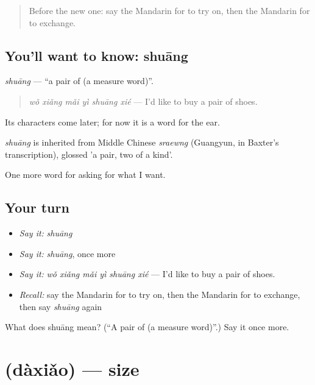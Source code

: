 \begin{quote}
Before the new one: say the Mandarin for to try on, then the Mandarin for to exchange.
\end{quote}

\subsection*{You'll want to know: shuāng}
\emph{shuāng} — \textquotedblleft{}a pair of (a measure word)\textquotedblright{}.

\begin{quote}
\emph{wǒ xiǎng mǎi yì shuāng xié} — I'd like to buy a pair of shoes.
\end{quote}

Its characters come later; for now it is a word for the ear.

\begin{cousinweb}
\emph{shuāng} is inherited from Middle Chinese \emph{sraewng} (Guangyun, in Baxter's transcription), glossed 'a pair, two of a kind'.
\end{cousinweb}

\begin{grammarlens}[title={What you've built}]
One more word for asking for what I want.
\end{grammarlens}

\subsection*{Your turn}
\begin{itemize}
\raggedright
  \item \emph{Say it:} \emph{shuāng}
  \item \emph{Say it:} \emph{shuāng}, once more
  \item \emph{Say it:} \emph{wǒ xiǎng mǎi yì shuāng xié} — I'd like to buy a pair of shoes.
  \item \emph{Recall:} say the Mandarin for to try on, then the Mandarin for to exchange, then say \emph{shuāng} again
\end{itemize}

\begin{tcolorbox}[breakable,colback=teal!4,colframe=teal!35!black,title={Before you move on}]
What does shuāng mean? (\textquotedblleft{}A pair of (a measure word)\textquotedblright{}.) Say it once more.
\end{tcolorbox}
\section[\texorpdfstring{\zh{大小} (dàxiǎo)}{大小 (dàxiǎo)}]{ (dàxiǎo) — size}

